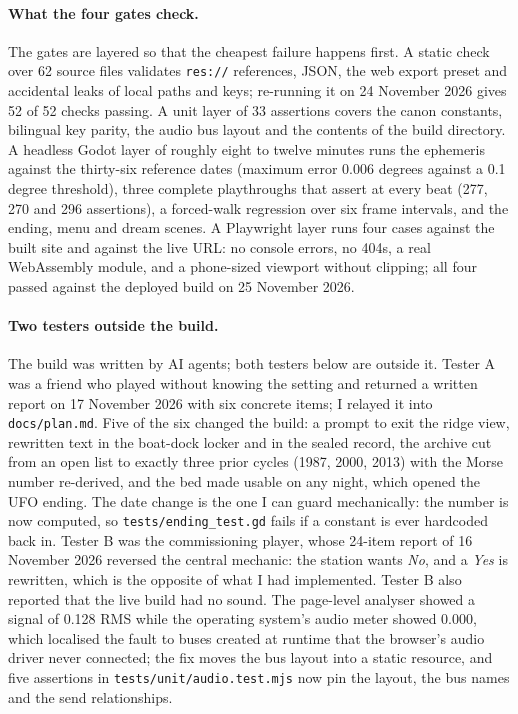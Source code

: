 \documentclass[12pt,a4paper]{article}
\begin{document}
\paragraph{What the four gates check.}
The gates are layered so that the cheapest failure happens first. A static check
over 62 source files validates \texttt{res://} references, JSON, the web export
preset and accidental leaks of local paths and keys; re-running it on 24 November
2026 gives 52 of 52 checks passing. A unit layer of 33 assertions covers the canon
constants, bilingual key parity, the audio bus layout and the contents of the
build directory. A headless Godot layer of roughly eight to twelve minutes runs the
ephemeris against the thirty-six reference dates (maximum error 0.006 degrees
against a 0.1 degree threshold), three complete playthroughs that assert at every
beat (277, 270 and 296 assertions), a forced-walk regression over six frame
intervals, and the ending, menu and dream scenes. A Playwright layer runs four
cases against the built site and against the live URL: no console errors, no 404s,
a real WebAssembly module, and a phone-sized viewport without clipping; all four
passed against the deployed build on 25 November 2026.\autocite{obslog2026live}

\paragraph{Two testers outside the build.}
The build was written by AI agents; both testers below are outside it. Tester A
was a friend who played without knowing the setting and returned a written report
on 17 November 2026 with six concrete items; I relayed it into
\texttt{docs/plan.md}. Five of the six changed the build: a prompt to exit the
ridge view, rewritten text in the boat-dock locker and in the sealed record, the
archive cut from an open list to exactly three prior cycles (1987, 2000, 2013) with
the Morse number re-derived, and the bed made usable on any night, which opened
the UFO ending. The date change is the one I can guard mechanically: the number is
now computed, so \texttt{tests/ending\_test.gd} fails if a constant is ever
hardcoded back in. Tester B was the commissioning player, whose 24-item report of
16 November 2026 reversed the central mechanic: the station wants \emph{No}, and a
\emph{Yes} is rewritten, which is the opposite of what I had implemented. Tester B
also reported that the live build had no sound. The page-level analyser showed a
signal of 0.128 RMS while the operating system's audio meter showed 0.000, which
localised the fault to buses created at runtime that the browser's audio driver
never connected; the fix moves the bus layout into a static resource, and five
assertions in \texttt{tests/unit/audio.test.mjs} now pin the layout, the bus names
and the send relationships.
\end{document}
